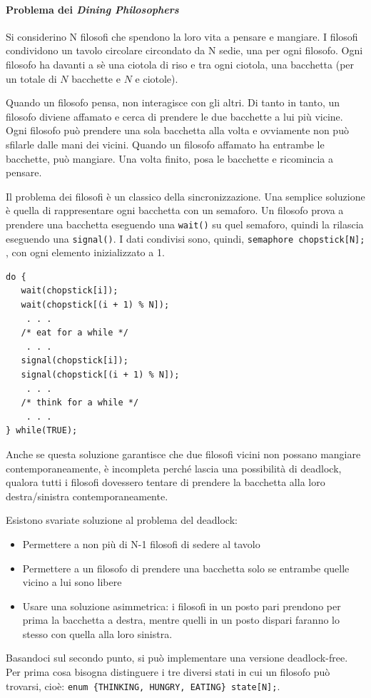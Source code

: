 \documentclass[a4paper]{article}
\begin{document}
\paragraph{Problema dei \textit{Dining Philosophers}}

Si considerino N filosofi che spendono la loro vita a pensare e mangiare. I filosofi condividono un tavolo circolare circondato da N sedie, una per ogni filosofo. Ogni filosofo ha davanti a sè una ciotola di riso e tra ogni ciotola, una bacchetta (per un totale di $N$ bacchette e $N$ e ciotole).

Quando un filosofo pensa, non interagisce con gli altri. Di tanto in tanto, un filosofo diviene affamato e cerca di prendere le due bacchette a lui più vicine. Ogni filosofo può prendere una sola bacchetta alla volta e ovviamente non può sfilarle dalle mani dei vicini. Quando un filosofo affamato ha entrambe le bacchette, può mangiare. Una volta finito, posa le bacchette e ricomincia a pensare.

Il problema dei filosofi è un classico della sincronizzazione. Una semplice soluzione è quella di rappresentare ogni bacchetta con un semaforo. Un filosofo prova a prendere una bacchetta eseguendo una \texttt{wait()} su quel semaforo, quindi la rilascia eseguendo una \texttt{signal()}. I dati condivisi sono, quindi, \texttt{semaphore chopstick[N];} , con ogni elemento inizializzato a 1.
\begin{verbatim}
do {
   wait(chopstick[i]);
   wait(chopstick[(i + 1) % N]);
    . . .
   /* eat for a while */
    . . .
   signal(chopstick[i]);
   signal(chopstick[(i + 1) % N]);
    . . .
   /* think for a while */
    . . .
} while(TRUE);
\end{verbatim}

Anche se questa soluzione garantisce che due filosofi vicini non possano mangiare contemporaneamente, è incompleta perché lascia una possibilità di deadlock, qualora tutti i filosofi dovessero tentare di prendere la bacchetta alla loro destra/sinistra contemporaneamente.

Esistono svariate soluzione al problema del deadlock:
\begin{itemize}
    \item Permettere a non più di N-1 filosofi di sedere al tavolo
    \item Permettere a un filosofo di prendere una bacchetta solo se entrambe quelle vicino a lui sono libere
    \item Usare una soluzione asimmetrica: i filosofi in un posto pari prendono per prima la bacchetta a destra, mentre quelli in un posto dispari faranno lo stesso con quella alla loro sinistra.
\end{itemize}
Basandoci sul secondo punto, si può implementare una versione deadlock-free. Per prima cosa bisogna distinguere i tre diversi stati in cui un filosofo può trovarsi, cioè: \texttt{enum \{THINKING, HUNGRY, EATING\} state[N];}.
\end{document}
